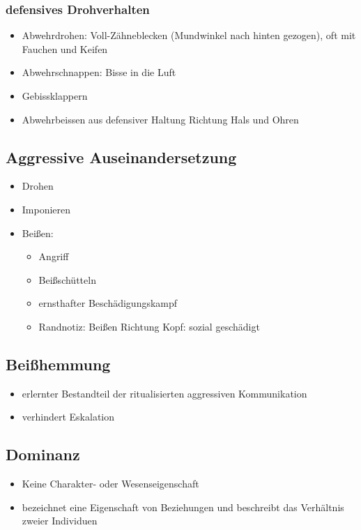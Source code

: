         \subsubsection{defensives Drohverhalten}
            \begin{itemize}
                \item Abwehrdrohen: Voll-Zähneblecken (Mundwinkel nach hinten gezogen), oft mit Fauchen und Keifen
                \item Abwehrschnappen: Bisse in die Luft
                \item Gebissklappern
                \item Abwehrbeissen aus defensiver Haltung Richtung Hals und Ohren
            \end{itemize}

    \subsection{Aggressive Auseinandersetzung}
        \begin{itemize}
            \item Drohen
            \item Imponieren
            \item Beißen:
            \begin{itemize}
                \item Angriff
                \item Beißschütteln
                \item ernsthafter Beschädigungskampf
                \item Randnotiz: Beißen Richtung Kopf: sozial \glqq geschädigt\grqq
            \end{itemize}
        \end{itemize}

    \subsection{Beißhemmung}
        \begin{itemize}
            \item erlernter Bestandteil der ritualisierten aggressiven Kommunikation
            \item verhindert Eskalation
        \end{itemize}

    \subsection{Dominanz}
        \begin{itemize}
            \item Keine Charakter- oder Wesenseigenschaft
            \item bezeichnet eine Eigenschaft von Beziehungen und beschreibt das Verhältnis zweier Individuen
        \end{itemize}

